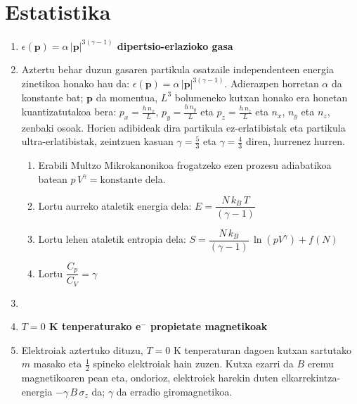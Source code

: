 \documentclass[10pt]{article}              %
\begin{document}
\cleardoublepage

\section*{Estatistika}

\begin{enumerate}

\item[] \textbf{$\epsilon(\textbf{p}) = \alpha\,|\textbf{p}|^{3(\gamma - 1)}$ dipertsio-erlazioko gasa}
\vspace{0.25cm}

\item Aztertu behar duzun gasaren partikula osatzaile independenteen energia zinetikoa honako hau da: $\epsilon(\textbf{p}) = \alpha\,|\textbf{p}|^{3(\gamma - 1)}$. Adierazpen horretan $\alpha$ da konstante bat; $\textbf{p}$ da momentua, $L^{3}$ bolumeneko kutxan honako era honetan kuantizatutakoa bera: $p_{x}=\frac{h\,n_{x}}{L}$, $p_{y}=\frac{h\,n_{y}}{L}$ eta $p_{z}=\frac{h\,n_{z}}{L}$ eta $n_{x}$, $n_{y}$ eta $n_{z}$, zenbaki osoak. Horien adibideak dira partikula ez-erlatibistak eta partikula ultra-erlatibistak, zeintzuen kasuan $\gamma = \frac{5}{3}$ eta $\gamma=\frac{4}{3}$ diren, hurrenez hurren.

\begin{enumerate}
\item Erabili Multzo Mikrokanonikoa frogatzeko ezen prozesu adiabatikoa batean $p\,V^{\gamma} = \textrm{konstante}$ dela.
\item Lortu aurreko ataletik energia dela: $E = \dfrac{N\,k_{B}\,T}{\left(\gamma -1 \right)}$
\item Lortu lehen ataletik entropia dela: $S = \dfrac{N\,k_{B}}{\left(\gamma -1 \right)}\,\ln\left( pV^{\gamma}\right) + f(N)$
\item Lortu $\dfrac{C_{p}}{C_{V}}=\gamma$
\end{enumerate}

\vspace{1cm}

\item[]
\item[] \textbf{$T=0$ K tenperaturako e$^{-}$ propietate magnetikoak}


\item Elektroiak aztertuko dituzu, $T=0$ K tenperaturan dagoen kutxan sartutako $m$ masako eta $\frac{1}{2}$ spineko elektroiak hain zuzen. Kutxa ezarri da $B$ eremu magnetikoaren pean eta, ondorioz, elektroiek harekin duten elkarrekintza-energia $-\gamma\,B\,\sigma_{z}$ da; $\gamma$ da erradio giromagnetikoa.\\


\end{enumerate}
\end{document}
